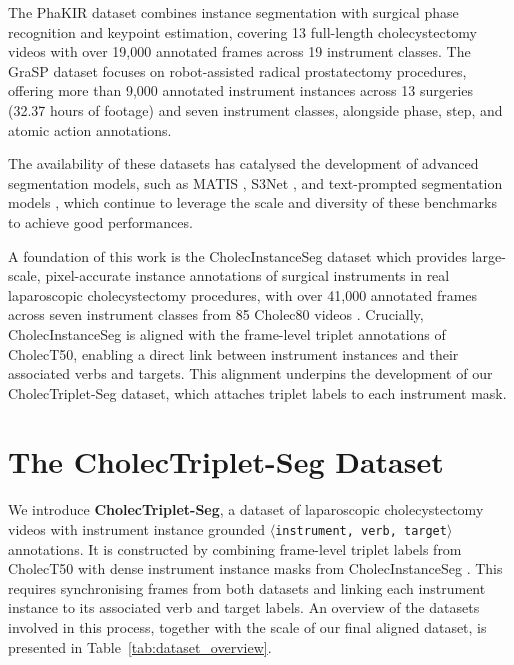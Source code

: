 \documentclass[pdflatex,sn-mathphys-num]{sn-jnl}%
\newcommand{\ivttriplet}{\texttt{$\langle$instrument, verb, target$\rangle$}\xspace}
\theoremstyle{thmstyleone}%
\theoremstyle{thmstyletwo}%
\theoremstyle{thmstylethree}%
\begin{document}
The PhaKIR dataset \cite{rueckert2025comparative} combines instance segmentation with surgical phase recognition and keypoint estimation, covering 13 full-length cholecystectomy videos with over 19,000 annotated frames across 19 instrument classes. The GraSP dataset \cite{ayobi2024pixelwise} focuses on robot-assisted radical prostatectomy procedures, offering more than 9,000 annotated instrument instances across 13 surgeries (32.37 hours of footage) and seven instrument classes, alongside phase, step, and atomic action annotations.

The availability of these datasets has catalysed the development of advanced segmentation models, such as MATIS \cite{ayobi2023matis}, S3Net \cite{baby2023forks_tfn}, and text-prompted segmentation models \cite{zhou2023text_tfn}, which continue to leverage the scale and diversity of these benchmarks to achieve good performances.

A foundation of this work is
the CholecInstanceSeg dataset \cite{alabi2025cholecinstanceseg} which provides large-scale, pixel-accurate instance annotations of surgical instruments in real laparoscopic cholecystectomy procedures, with over 41,000 annotated frames across seven instrument classes from 85 Cholec80 videos \cite{EndoNet_tfn}.
Crucially, CholecInstanceSeg is aligned with the frame-level triplet annotations of CholecT50, enabling a direct link between instrument instances and their associated verbs and targets. This alignment underpins the development of our CholecTriplet-Seg dataset, which attaches triplet labels to each instrument mask.




\section{The CholecTriplet-Seg Dataset}\label{sec::cholectriplet_seg_dataset}
We introduce \textbf{CholecTriplet-Seg}, a dataset of laparoscopic cholecystectomy videos with instrument instance grounded \ivttriplet annotations.
It is constructed by combining frame-level triplet labels from CholecT50 \cite{nwoye2022rendezvous} with dense instrument instance masks from CholecInstanceSeg \cite{alabi2025cholecinstanceseg}. This requires synchronising frames from both datasets and linking each instrument instance to its associated verb and target labels.
An overview of the datasets involved in this process, together with the scale of our final aligned dataset, is presented in Table~\ref{tab:dataset_overview}.
\end{document}
